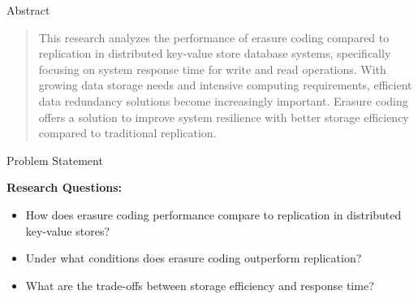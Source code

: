\documentclass[a2,portrait]{config/poster/a0poster}
\newcommand{\postersection}[1]{%
	\begin{tcolorbox}[
			colback=ITBblue,
			colframe=ITBblue,
			fonttitle=\bfseries,
			coltext=white,
			sharp corners,
			boxrule=0pt,
			top=0pt,
			bottom=0pt,
			halign=center
		]
		\normalsize #1
	\end{tcolorbox}%
}
\begin{document}
\begin{multicols}{2} %
\vspace{0.1cm}

\newcommand{\twocolimg}[2]{%
	\begin{center}
		\parbox{\dimexpr2\columnwidth+\columnsep\relax}{%
			\centering
			\texttt{[image: \#1]}
			\captionof{figure}{#2}
		}
	\end{center}
}

	\newcommand{\onecolimg}[2]{%
		\begin{center}
			\parbox{\columnwidth}{%
				\centering
				\texttt{[image: \#1]}
				\captionof{figure}{#2}
			}
		\end{center}
	}



	\postersection{Abstract}
	\begin{quote}
		This research analyzes the performance of erasure coding compared to replication in distributed key-value store database systems, specifically focusing on system response time for write and read operations. With growing data storage needs and intensive computing requirements, efficient data redundancy solutions become increasingly important. Erasure coding offers a solution to improve system resilience with better storage efficiency compared to traditional replication.
	\end{quote}


	\postersection{Problem Statement}
	
	\textbf{Research Questions:}
	\begin{itemize}
		\item How does erasure coding performance compare to replication in distributed key-value stores?
		\item Under what conditions does erasure coding outperform replication?
		\item What are the trade-offs between storage efficiency and response time?
	\end{itemize}


\end{multicols}
\end{document}
